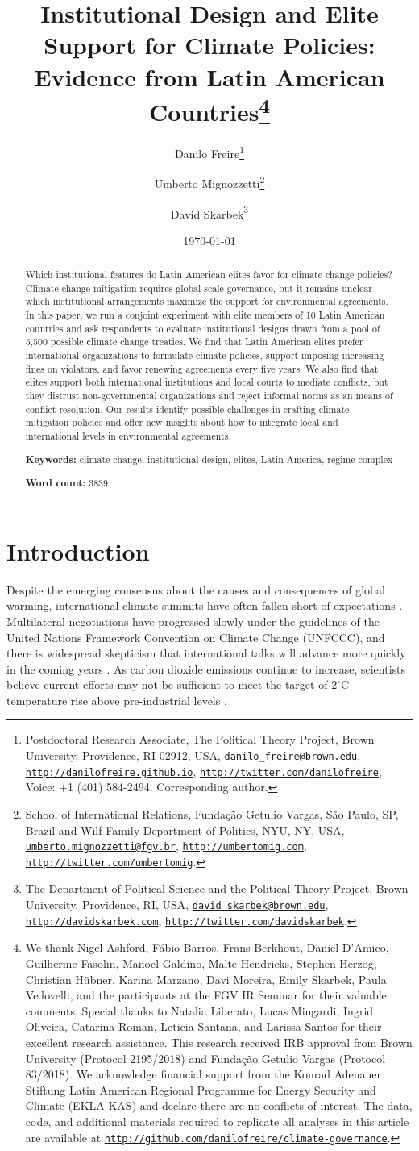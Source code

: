 \documentclass[a4paper,12pt]{article}
\title{Institutional Design and Elite Support for Climate Policies: Evidence from Latin American Countries\thanks{We thank Nigel Ashford, F\'{a}bio Barros, Frans Berkhout, Daniel D'Amico, Guilherme Fasolin, Manoel Galdino, Malte Hendricks, Stephen Herzog, Christian H\"{u}bner, Karina Marzano, Davi Moreira, Emily Skarbek, Paula Vedovelli, and the participants at the FGV IR Seminar for their valuable comments. Special thanks to Natalia Liberato, Lucas Mingardi, Ingrid Oliveira, Catarina Roman, Leticia Santana, and Larissa Santos for their excellent research assistance. This research received IRB approval from Brown University (Protocol 2195/2018) and Funda\c{c}\~{a}o Getulio Vargas (Protocol 83/2018). We acknowledge financial support from the Konrad Adenauer Stiftung Latin American Regional Programme for Energy Security and Climate (EKLA-KAS) and declare there are no conflicts of interest. The data, code, and additional materials required to replicate all analyses in this article are available at \href{http://github.com/danilofreire/climate-governance}{\texttt{http://github.com/danilofreire/climate-governance}}.}}
\author{Danilo Freire\thanks{Postdoctoral Research Associate, The Political Theory Project, Brown University, Providence, RI 02912, USA, \href{mailto:danilo_freire@brown.edu}{\texttt{danilo\_freire@brown.edu}}, \href{http://danilofreire.github.io}{\texttt{http://danilofreire.github.io}}, \href{http://twitter.com/danilofreire}{\texttt{http://twitter.com/danilofreire}}, Voice: +1 (401) 584-2494. Corresponding author.}
\and Umberto Mignozzetti\thanks{School of International Relations, Funda\c{c}\~{a}o Getulio Vargas, S\~{a}o Paulo, SP, Brazil and Wilf Family Department of Politics, NYU, NY, USA, \href{mailto:umberto.mignozzetti@fgv.br}{\texttt{umberto.mignozzetti@fgv.br}}, \href{http://umbertomig.com}{\texttt{http://umbertomig.com}}, \href{http://twitter.com/umbertomig}{\texttt{http://twitter.com/umbertomig}}.}
\and David Skarbek\thanks{The Department of Political Science and the Political Theory Project, Brown University, Providence, RI, USA, \href{mailto:david_skarbek@brown.edu}{\texttt{david\_skarbek@brown.edu}}, \href{http://davidskarbek.com}{\texttt{http://davidskarbek.com}}, \href{http://twitter.com/davidskarbek}{\texttt{http://twitter.com/davidskarbek}}.}}
\date{\today}
\begin{document}
\maketitle

\begin{abstract}
\onehalfspacing
\noindent 
Which institutional features do Latin American elites favor for climate change policies? Climate change mitigation requires global scale governance, but it remains unclear which institutional arrangements maximize the support for environmental agreements. In this paper, we run a conjoint experiment with elite members of 10 Latin American countries and ask respondents to evaluate institutional designs drawn from a pool of 5,500 possible climate change treaties. We find that Latin American elites prefer international organizations to formulate climate policies, support imposing increasing fines on violators, and favor renewing agreements every five years. We also find that elites support both international institutions and local courts to mediate conflicts, but they distrust non-governmental organizations and reject informal norms as an means of conflict resolution. Our results identify possible challenges in crafting climate mitigation policies and offer new insights about how to integrate local and international levels in environmental agreements. 

\vspace{.5cm}

\noindent 
\textbf{Keywords:} climate change, institutional design, elites, Latin America, regime complex

\vspace{.5cm}

\noindent 
\textbf{Word count:} 3839
\end{abstract}

\newpage

\doublespacing

\section{Introduction}%
\label{sec:introduction}

Despite the emerging consensus about the causes and consequences of global warming, international climate summits have often fallen short of expectations \citep{rogelj2010copenhagen, rosen2015wrong, victor2017prove}. Multilateral negotiations have progressed slowly under the guidelines of the United Nations Framework Convention on Climate Change (UNFCCC), and there is widespread skepticism that international talks will advance more quickly in the coming years \citep{cole2015advantages, hjerpe2015views}. As carbon dioxide emissions continue to increase, scientists believe current efforts may not be sufficient to meet the target of $2^{\circ}$C temperature rise above pre-industrial levels \citep{jordan2015emergence}.
\end{document}
